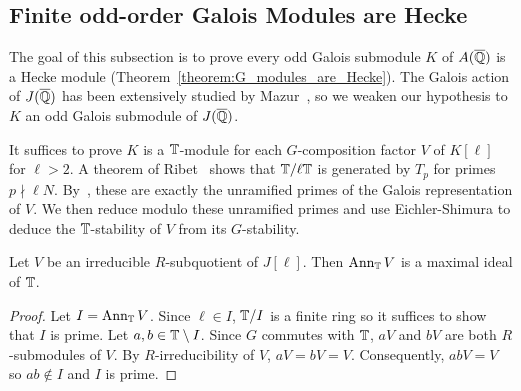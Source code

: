 \documentclass{article}
\begin{document}
\subsection{Finite odd-order Galois Modules are Hecke}%
\label{sub:finite_odd_order_galois_modules_are_hecke}

The goal of this subsection is to prove every odd Galois submodule $K$ of
$A(\overline{\mathbb{Q}})$ is a Hecke module (Theorem~\ref{theorem:G_modules_are_Hecke}). The
Galois action of $J(\overline{\mathbb{Q}})$ has been extensively studied by
Mazur~\cite{mazur:eisenstein}, so we weaken our hypothesis to $K$ an odd Galois
submodule of $J(\overline{\mathbb{Q}})$. 

It suffices to prove $K$ is a $\mathbb{T}$-module for each $G$-composition factor $V$
of $K[\ell]$ for $\ell>2$. A theorem of Ribet~\cite[Proposition
2]{ribet:mult_p_finite} shows that $\mathbb{T}/\ell \mathbb{T}$ is generated by $T_p$ for
primes $p\nmid \ell N$. By~\cite[\S 14]{mazur:eisenstein}, these are exactly
the unramified primes of the Galois representation of $V$. We then reduce
modulo these unramified primes and use Eichler-Shimura to deduce the
$\mathbb{T}$-stability of $V$ from its $G$-stability.

\begin{lemma}\label{lemma:cherry_street}
    Let $V$ be an irreducible $R$-subquotient of $J[\ell]$. Then $\operatorname{Ann}_{\mathbb{T}} V$
    is a maximal ideal of $\mathbb{T}$.
\end{lemma}
\begin{proof}
    Let $I=\operatorname{Ann}_{\mathbb{T}} V$. Since $\ell\in I$, $\mathbb{T}/I$ is a finite ring so it
    suffices to show that $I$ is prime. Let $a,b\in \mathbb{T}\setminus I$. Since $G$
    commutes with $\mathbb{T}$, $aV$ and $bV$ are both $R$-submodules of $V$. By
    $R$-irreducibility of $V$, $aV=bV=V$. Consequently, $abV=V$ so $ab\notin I$
    and $I$ is prime.
\end{proof}
\end{document}
